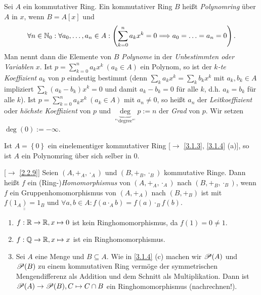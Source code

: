 \documentclass[../../main.tex]{subfiles}
\begin{document}
\begin{df}\label{3.2.6}
Sei $A$ ein kommutativer Ring. Ein kommutativer Ring $B$ heißt \emph{Polynomring} über $A$ in $x$, wenn $B=A[x]$ und 
$$\forall n\in\mathbb N_0:\forall a_0,\ldots,a_n \in A:\left(\sum_{k=0}^na_kx^k=0\Longrightarrow a_0=\ldots=a_n=0\right).$$
Man nennt dann die Elemente von $B$ \emph{Polynome} in
der \emph{Unbestimmten oder Variablen} $x$. Ist $p=\sum_{k=0}^n a_k x^k ~(a_k\in A)$ ein Polynom, so ist der \emph{$k$-te Koeffizient} $a_k$ von $p$ eindeutig bestimmt (denn $\sum_{k} a_k x^k =\sum_k b_k x^k$ mit $a_k,b_k\in A$ impliziert $\sum_k(a_k-b_k)x^k=0$ und damit $a_k-b_k=0$ für alle $k$, d.h. $a_k=b_k$ für alle $k$).
Ist $p=\sum_{k=0}^n a_k x^k ~(a_k\in A)$ mit $a_n\neq 0$, so heißt $a_n$ der \emph{Leitkoeffizient} oder \emph{höchste Koeffizient} von $p$ und $\underbrace{\deg}_\text{"`degree"'} p:= n$ der \emph{Grad} von $p$. Wir setzen $\deg(0) := -\infty$.
\end{df}

\begin{bsp}\label{3.2.7}
Ist $A=\left\{0\right\}$ ein einelementiger kommutativer Ring [$\to$ \ref{3.1.3}, \ref{3.1.4} (a)], so ist $A$ ein Polynomring über sich selber in $0$.
\end{bsp}

\begin{df}\mbox{}[$\to$ \ref{2.2.9}]\label{3.2.8}
Seien $(A,+_A,\cdot_A)$ und $(B,+_B,\cdot_B)$ kommutative Ringe. Dann heißt $f$ ein (Ring-)\emph{Homomorphismus} von $(A,+_A,\cdot_A)$ nach $(B,+_B,\cdot_B)$, wenn $f$ ein Gruppenhomomorphismus von $(A,+_A)$ nach $(B,+_B)$ ist mit $\underline{\underline{f(1_A)=1_B}}$ und $\forall a,b\in A: f(a\cdot_A b)=f(a)\cdot_B f(b)$.
\end{df}

\begin{bsp}\label{3.2.9}
\begin{enumerate}[\normalfont(a)]
\item $f:\mathbb R\to\mathbb R, x\mapsto 0$ ist kein Ringhomomorphismus, da $f(1)=0\neq 1$.
\item $f:\mathbb Q\to\mathbb R, x\mapsto x$ ist ein Ringhomomorphismus.
\item Sei $A$ eine Menge und $B\subseteq A$. Wie in \ref{3.1.4} (c) machen wir $\mathcal P(A)$ und $\mathcal P(B)$ zu einem kommutativen Ring vermöge der symmetrischen Mengendifferenz als Addition und dem Schnitt als Multiplikation. Dann ist $\mathcal P(A)\to \mathcal P(B), C\mapsto C\cap B$ ein Ringhomomorphismus (nachrechnen!).
\end{enumerate}
\end{bsp}
\end{document}
